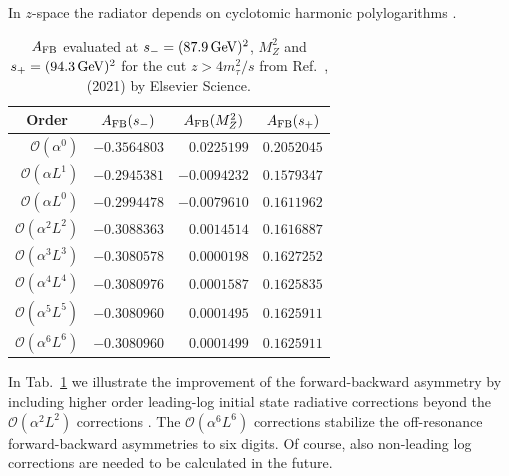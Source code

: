 In $z$-space the radiator depends on cyclotomic harmonic polylogarithms 
\cite{Ablinger:2011te}.
\begin{table}[ht]
   \centering
       \caption{ $A_{\rm FB}$ evaluated at $s_-=(87.9\, {\rm GeV})^2$, $M_Z^2$
                        and $s_+=(94.3\,{\rm GeV})^2$ for the cut $z>4m_\tau^2/s$ from
        Ref.~\cite{Blumlein:2021jdl}, \TCop (2021) by Elsevier Science.}
        \label{tab:AFB1}
    \begin{tabular}{r|r|r|r}
    \multicolumn{1}{c|}{ Order} &
    \multicolumn{1}{c|}{$A_{\rm FB}(s_-)$  } &
    \multicolumn{1}{c|}{$A_{\rm FB}(M_Z^2)$} &
    \multicolumn{1}{c}{$A_{\rm FB}(s_+)$} \\
    \hline
                $\mathcal{O}(\alpha^0)$         & $-0.3564803$          
& $ 0.0225199$  & $0.2052045$
                \\
                $\mathcal{O}(\alpha L^1)$       & $-0.2945381$          
& $-0.0094232$  & $0.1579347$
                \\
                $\mathcal{O}(\alpha L^0)$       & $-0.2994478$          
& $-0.0079610$  & $0.1611962$
                \\
                $\mathcal{O}(\alpha^2 L^2)$     & $-0.3088363$          
& $ 0.0014514$  & $0.1616887$
                \\
                $\mathcal{O}(\alpha^3 L^3)$     & $-0.3080578$          
& $ 0.0000198$  & $0.1627252$
                \\
                $\mathcal{O}(\alpha^4 L^4)$     & $-0.3080976$          
& $ 0.0001587$  & $0.1625835$
                \\
                $\mathcal{O}(\alpha^5 L^5)$     & $-0.3080960$          
& $ 0.0001495$  & $0.1625911$
                \\
                $\mathcal{O}(\alpha^6 L^6)$     & $-0.3080960$          
& $ 0.0001499$  & $0.1625911$
\\
        \end{tabular}
\end{table}

\renewcommand{\arraystretch}{1.0}

\noindent
In Tab.~\ref{tab:AFB1} we illustrate the improvement of the forward-backward 
asymmetry by including higher order leading-log initial state radiative 
corrections beyond the $\mathcal{O}(\alpha^2 L^2)$ corrections \cite{Beenakker:1989km}. The 
$\mathcal{O}(\alpha^6 L^6)$ corrections stabilize the off-resonance forward-backward asymmetries to 
six digits. Of course, also non-leading log corrections are needed to be 
calculated in the future.

